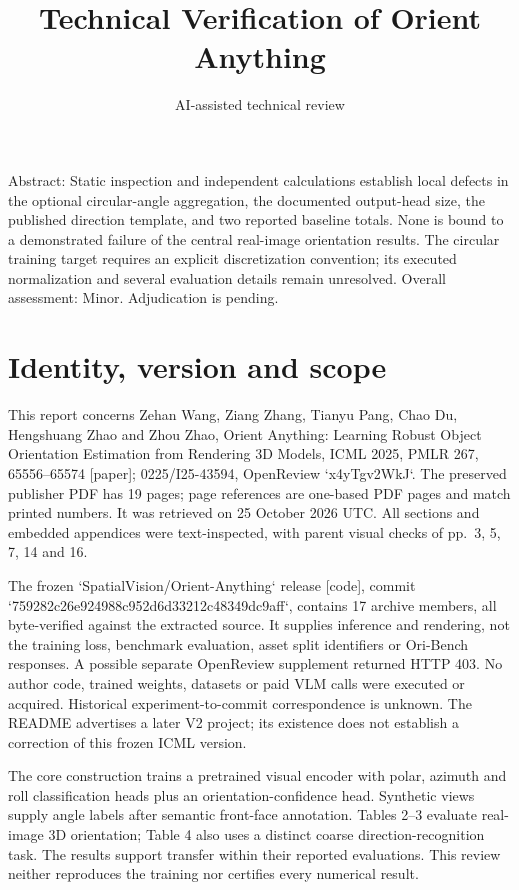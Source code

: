 \documentclass[10pt]{article}
\title{Technical Verification of Orient Anything}
\author{AI-assisted technical review}
\date{}
\begin{document}
\maketitle
Abstract: Static inspection and independent calculations establish local defects in the optional circular-angle aggregation, the documented output-head size, the published direction template, and two reported baseline totals. None is bound to a demonstrated failure of the central real-image orientation results. The circular training target requires an explicit discretization convention; its executed normalization and several evaluation details remain unresolved. Overall assessment: Minor. Adjudication is pending.\par
\section*{Identity, version and scope}
This report concerns Zehan Wang, Ziang Zhang, Tianyu Pang, Chao Du, Hengshuang Zhao and Zhou Zhao, Orient Anything: Learning Robust Object Orientation Estimation from Rendering 3D Models, ICML 2025, PMLR 267, 65556–65574 [paper]; 0225/I25-43594, OpenReview `x4yTgv2WkJ`. The preserved publisher PDF has 19 pages; page references are one-based PDF pages and match printed numbers. It was retrieved on 25 October 2026 UTC. All sections and embedded appendices were text-inspected, with parent visual checks of pp. 3, 5, 7, 14 and 16.\par
The frozen `SpatialVision/Orient-Anything` release [code], commit `759282c26e924988c952d6d33212c48349dc9aff`, contains 17 archive members, all byte-verified against the extracted source. It supplies inference and rendering, not the training loss, benchmark evaluation, asset split identifiers or Ori-Bench responses. A possible separate OpenReview supplement returned HTTP 403. No author code, trained weights, datasets or paid VLM calls were executed or acquired. Historical experiment-to-commit correspondence is unknown. The README advertises a later V2 project; its existence does not establish a correction of this frozen ICML version.\par
The core construction trains a pretrained visual encoder with polar, azimuth and roll classification heads plus an orientation-confidence head. Synthetic views supply angle labels after semantic front-face annotation. Tables 2–3 evaluate real-image 3D orientation; Table 4 also uses a distinct coarse direction-recognition task. The results support transfer within their reported evaluations. This review neither reproduces the training nor certifies every numerical result.\par
\end{document}
